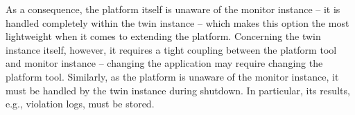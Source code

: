As a consequence, the platform itself is unaware of the monitor instance -- it is handled completely within the twin instance -- which makes this option the most lightweight when it comes
to extending the platform. Concerning the twin instance itself, however, it requires a tight coupling between the platform tool and monitor instance --
changing the application may require changing the platform tool.
Similarly, as the platform is unaware of the monitor instance, it must be handled by the twin instance during shutdown.
In particular, its results, e.g., violation logs, must be stored.

%
%
%
%
%
%
%


